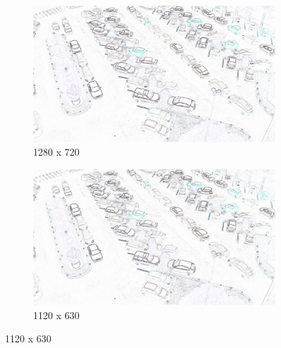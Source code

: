 \begin{appendix}
\begin{figure}[H]
    \begin{subfigure}{.5\textwidth}
        \centering
        \includegraphics[width=.85\linewidth]{img/conception/image_process/edge-downsample/7.png}
        \caption{1280 x 720}
    \end{subfigure}%
    \begin{subfigure}{.5\textwidth}
        \centering
        \includegraphics[width=.85\linewidth]{img/conception/image_process/edge-downsample/6.png}
        \caption{1120 x 630}
    \end{subfigure}%


\end{figure}
\end{appendix}
